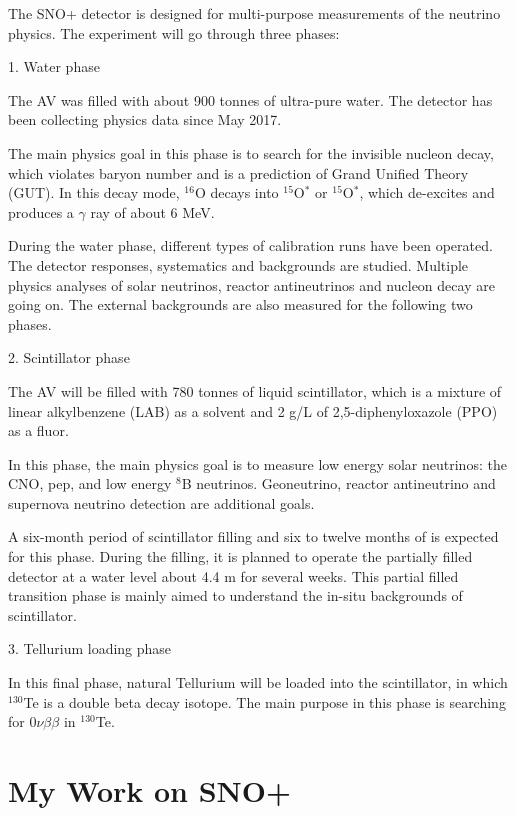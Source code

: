 \documentclass[preprint,12pt]{elsarticle}
\numberwithin{equation}{section}
\begin{document}
The SNO+ detector is designed for multi-purpose measurements of the neutrino physics.
The experiment will go through three phases\cite{whitepaper}: 

1. Water phase 

The AV was filled with about 900 tonnes of ultra-pure water. The detector has been collecting physics data since May 2017.

The main physics goal in this phase is to search for the invisible nucleon decay, which violates baryon number and is a prediction of Grand Unified Theory (GUT). In this decay mode, $^{16}$O decays into $^{15}$O$^*$ or $ ^{15}$O$^*$, which de-excites and produces a $\gamma$ ray of about 6 MeV.

During the water phase, different types of calibration runs have been operated. The detector responses, systematics and backgrounds are studied. Multiple physics analyses of solar neutrinos, reactor antineutrinos and nucleon decay are going on. The external backgrounds are also measured for the following two phases. 

2. Scintillator phase

The AV will be filled with 780 tonnes of liquid scintillator, which is a mixture of linear alkylbenzene (LAB) as a solvent and 2 g/L of 2,5-diphenyloxazole (PPO) as a fluor.

In this phase, the main physics goal is to measure low energy solar neutrinos: the CNO, pep, and low energy $^8$B neutrinos. Geoneutrino, reactor antineutrino and supernova neutrino detection are additional goals.

A six-month period of scintillator filling and six to twelve months of  is expected for this phase. During the filling, it is planned to operate the partially filled detector at a water level about 4.4 m for several weeks. This partial filled transition phase is mainly aimed to understand the in-situ backgrounds of scintillator. 

3. Tellurium loading phase

In this final phase, natural Tellurium will be loaded into the scintillator, in which $^{130}$Te is a double beta decay isotope. The main purpose in this phase is searching for $0\nu\beta\beta$ in $^{130}$Te.

\section{My Work on SNO+}
\end{document}
